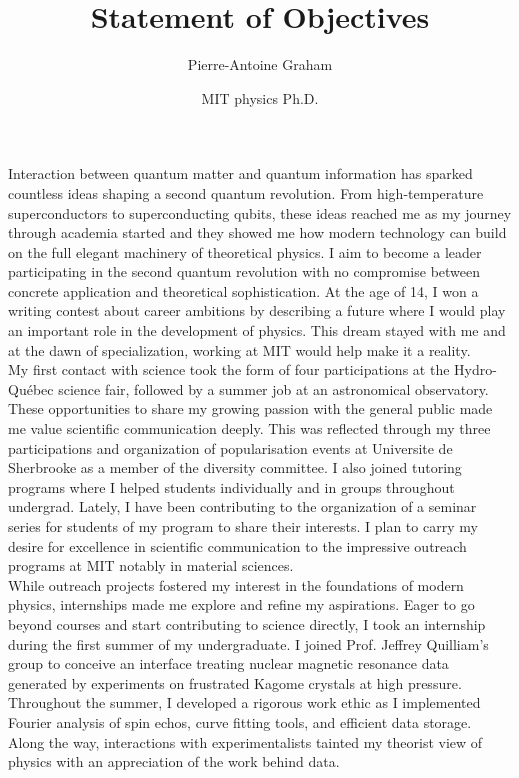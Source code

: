 \documentclass[12pt]{article}
\title{Statement of Objectives}
\author{Pierre-Antoine Graham}
\date{MIT physics Ph.D.}
\begin{document}
\maketitle
\vspace{0.5cm}

Interaction between quantum matter and quantum information has sparked countless ideas shaping a second quantum revolution. From high-temperature superconductors to superconducting qubits, these ideas reached me as my journey through academia started and they showed me how modern technology can build on the full elegant machinery of theoretical physics. I aim to become a leader participating in the second quantum revolution with no compromise between concrete application and theoretical sophistication. At the age of 14, I won a writing contest about career ambitions by describing a future where I would play an important role in the development of physics. This dream stayed with me and at the dawn of specialization, working at MIT would help make it a reality.\\ 

My first contact with science took the form of four participations at the Hydro-Québec science fair, followed by a summer job at an astronomical observatory. These opportunities to share my growing passion with the general public made me value scientific communication deeply. This was reflected through my three participations and organization of popularisation events at Universite de Sherbrooke as a member of the diversity committee. I also joined tutoring programs where I helped students individually and in groups throughout undergrad. Lately, I have been contributing to the organization of a seminar series for students of my program to share their interests. I plan to carry my desire for excellence in scientific communication to the impressive outreach programs at MIT notably in material sciences.\\  

While outreach projects fostered my interest in the foundations of modern physics, internships made me explore and refine my aspirations. Eager to go beyond courses and start contributing to science directly, I took an internship during the first summer of my undergraduate. I joined Prof. Jeffrey Quilliam's group to conceive an interface treating nuclear magnetic resonance data generated by experiments on frustrated Kagome crystals at high pressure. Throughout the summer, I developed a rigorous work ethic as I implemented Fourier analysis of spin echos, curve fitting tools, and efficient data storage. Along the way, interactions with experimentalists tainted my theorist view of physics with an appreciation of the work behind data.\\
\end{document}
